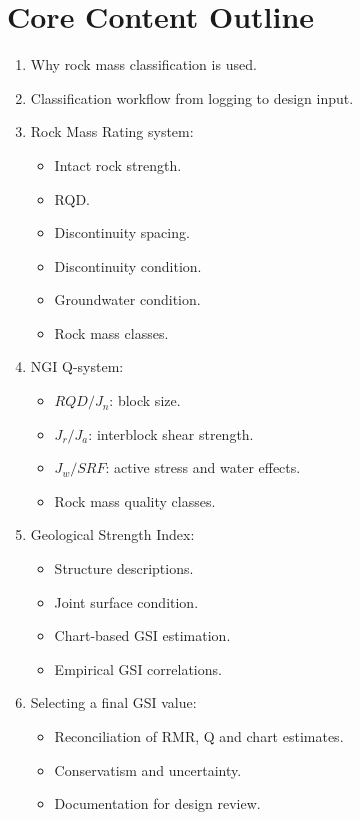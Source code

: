 \documentclass[12pt,oneside]{book}
\begin{document}
\section{Core Content Outline}
\begin{enumerate}
    \item Why rock mass classification is used.
    \item Classification workflow from logging to design input.
    \item Rock Mass Rating system:
    \begin{itemize}
        \item Intact rock strength.
        \item RQD.
        \item Discontinuity spacing.
        \item Discontinuity condition.
        \item Groundwater condition.
        \item Rock mass classes.
    \end{itemize}
    \item NGI Q-system:
    \begin{itemize}
        \item \(RQD/J_n\): block size.
        \item \(J_r/J_a\): interblock shear strength.
        \item \(J_w/SRF\): active stress and water effects.
        \item Rock mass quality classes.
    \end{itemize}
    \item Geological Strength Index:
    \begin{itemize}
        \item Structure descriptions.
        \item Joint surface condition.
        \item Chart-based GSI estimation.
        \item Empirical GSI correlations.
    \end{itemize}
    \item Selecting a final GSI value:
    \begin{itemize}
        \item Reconciliation of RMR, Q and chart estimates.
        \item Conservatism and uncertainty.
        \item Documentation for design review.
    \end{itemize}
\end{enumerate}
\end{document}

